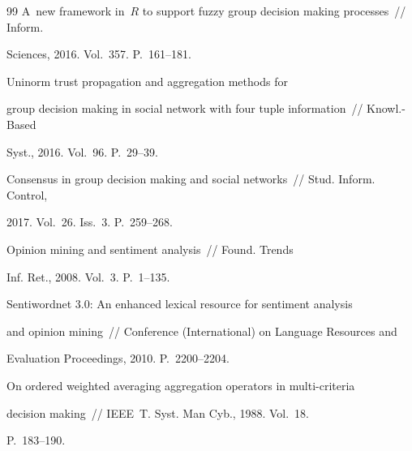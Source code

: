 {{\begin{thebibliography}{99}
A~new framework in~$R$ to support fuzzy group decision making processes~/\!\!/ Inform. 


Sciences, 2016. Vol.~357. P.~161--181.




 Uninorm trust propagation and aggregation methods for 


group decision making in social network with four tuple information~/\!\!/ Knowl.-Based 


Syst., 2016. Vol.~96. P.~29--39.






Consensus in group decision making and social networks~/\!\!/ Stud. Inform.  Control, 


2017. Vol.~26. Iss.~3. P.~259--268.




 Opinion mining and sentiment analysis~/\!\!/ Found. Trends 


Inf. Ret., 2008. Vol.~3. P.~1--135.




 Sentiwordnet 3.0: An enhanced lexical resource for sentiment analysis 


and opinion mining~/\!\!/ Conference  (International) on Language Resources and 


Evaluation Proceedings, 2010. P.~2200--2204.







 On ordered weighted averaging aggregation operators in multi-criteria 


decision making~/\!\!/ IEEE~T. Syst. Man  Cyb., 1988. Vol.~18. 


P.~183--190.





        \end{thebibliography}


} }








\vspace*{-3pt}





